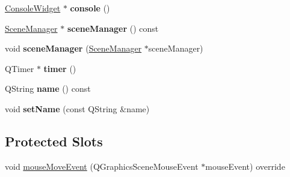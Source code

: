 \begin{DoxyCompactItemize}
\item 
\mbox{\label{class_game_scene_a774aaa53865ee6184b3bbcec5ed976b0}} 
\hyperlink{class_console_widget}{Console\+Widget} $\ast$ {\bfseries console} ()
\item 
\mbox{\label{class_game_scene_ac0fedd57d4e9d653803b27fd62485211}} 
\hyperlink{class_scene_manager}{Scene\+Manager} $\ast$ {\bfseries scene\+Manager} () const
\item 
\mbox{\label{class_game_scene_a415fd6b00796cce9ac40618e3f94db4b}} 
void {\bfseries scene\+Manager} (\hyperlink{class_scene_manager}{Scene\+Manager} $\ast$scene\+Manager)
\item 
\mbox{\label{class_game_scene_a2f075555a06267a4e150506c423846b0}} 
Q\+Timer $\ast$ {\bfseries timer} ()
\item 
\mbox{\label{class_game_scene_a0fd4969df4e5f5f635f9ab5d3e66c404}} 
Q\+String {\bfseries name} () const
\item 
\mbox{\label{class_game_scene_a6eb8d5be7ee8f1ebb50a7fd49e9c2a35}} 
void {\bfseries set\+Name} (const Q\+String \&name)
\end{DoxyCompactItemize}
\subsection*{Protected Slots}
\begin{DoxyCompactItemize}
\item 
void \hyperlink{class_game_scene_a60e084f3ade89e765a5ff86f2c0d7bf1}{mouse\+Move\+Event} (Q\+Graphics\+Scene\+Mouse\+Event $\ast$mouse\+Event) override
\end{DoxyCompactItemize}
